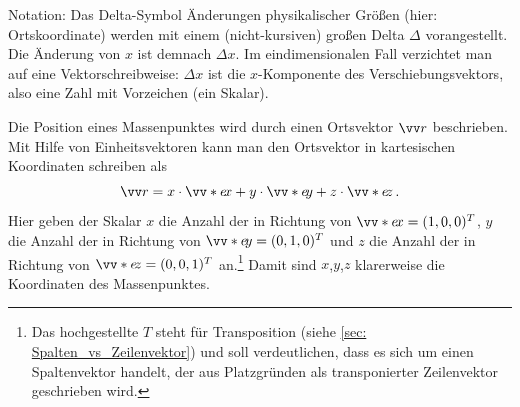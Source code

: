 \begin{rememberbox}{Notation: Das Delta-Symbol}
    Änderungen physikalischer Größen (hier: Ortskoordinate) werden mit einem (nicht-kursiven) großen Delta $\Delta$ vorangestellt. Die Änderung von $x$ ist demnach $\Delta x$. Im eindimensionalen Fall verzichtet man auf eine Vektorschreibweise: $\Delta x$ ist die $x$-Komponente des Verschiebungsvektors, also eine Zahl mit Vorzeichen (ein Skalar).
\end{rememberbox}
\noindent Die Position eines Massenpunktes wird durch einen Ortsvektor $\ivec{r}$ beschrieben. Mit Hilfe von Einheitsvektoren kann man den Ortsvektor in kartesischen Koordinaten schreiben als
\begin{equation}\label{eq: vektor_aufteilung_einheitsvektoren}
    \ivec{r} = x\cdot\ivecS{e}{x} + y\cdot\ivecS{e}{y} + z\cdot\ivecS{e}{z}\mDot
\end{equation}
Hier geben der Skalar $x$ die Anzahl der  in Richtung von $\ivecS{e}{x} = \inlrowThree{1}{0}{0}^T$, $y$ die Anzahl der  in Richtung von $\ivecS{e}{y} = \inlrowThree{0}{1}{0}^T$ und $z$ die Anzahl der  in Richtung von $\ivecS{e}{z} = \inlrowThree{0}{0}{1}^T$ an.\footnote{Das hochgestellte $T$ steht für Transposition (siehe \cref{sec: Spalten_vs_Zeilenvektor}) und soll verdeutlichen, dass es sich um einen Spaltenvektor handelt, der aus Platzgründen als transponierter Zeilenvektor geschrieben wird.} Damit sind $x$,$y$,$z$ klarerweise die Koordinaten des Massenpunktes. 

